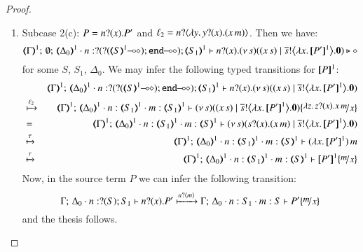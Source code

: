 \begin{proof}
\begin{enumerate}[1.]
	\item	Subcase 2(c): $P = n ? (x) . P'$ and $\ell_2 = n ? \langle \lambda y.\,y ? (x) . (x\, {m}) \rangle$.
		Then we have:
%
		\[
			\mapt{\Gamma}^{1};\, \emptyset;\, \mapt{\Delta_0}^{1} \cat 
			n: \btinp{\lhot{\btinp{\lhot{\tmap{S}{1}}}\tinact}} \tmap{S_1}{1}
			\proves
			\binp{n}{x} \newsp{s}{(\appl{x}{s})
			\Par 
			\bbout{\dual{s}}{\abs{x}{\pmap{P'}{1}}} \inact}
			\hastype \Proc
		\]
%
		for some $S$, $S_1$, $\Delta_0$.
		We may infer the following typed transitions for $[\!\![P]\!\!]^1$:
%
		\begin{eqnarray*}
			& & 
			\mapt{\Gamma}^{1};\, %
			\mapt{\Delta_0}^{1} \cat 
			n: \btinp{\lhot{\btinp{\lhot{\tmap{S}{1}}}\tinact}} \tmap{S_1}{1}
			\proves
			\binp{n}{x} \newsp{s}{(\appl{x}{s}) 
							\Par 
							\bbout{\dual{s}}{\abs{x}{\pmap{P'}{1}}} \inact} \\
			& \hby{\ell_2} & 
			\mapt{\Gamma}^{1};\, %
			\mapt{\Delta_0}^{1} \cat 
			n:\tmap{S_1}{1}
			\cat m:\tmap{S_1}{1}
			\proves
			\newsp{s}{(\appl{x}{s}) 
				\Par 
				\bbout{\dual{s}}{\abs{x}{\pmap{P'}{1}}} \inact} \subst{\abs{z}\binp{z}{x}\appl{x}{m}}{x} \\
			& = & 
			\mapt{\Gamma}^{1};\, %
			\mapt{\Delta_0}^{1} 
			\cat n:\tmap{S_1}{1}
			\cat m:\tmap{S}{1}
			\proves
			\newsp{s}{\binp{s}{x}(\appl{x}{m}) 
				\Par 
				\bbout{\dual{s}}{\abs{x}{\pmap{P'}{1}}} \inact}  \\
			& \hby{\tau} & 
			\mapt{\Gamma}^{1};\, %
			\mapt{\Delta_0}^{1} 
			\cat n:\tmap{S_1}{1}
			\cat m:\tmap{S}{1}
			\proves
			\appl{(\abs{x}{\pmap{P'}{1}})}{m}   \\
			& \hby{\tau} & 
			\mapt{\Gamma}^{1};\, %
			\mapt{\Delta_0}^{1} 
			\cat n:\tmap{S_1}{1}
			\cat m:\tmap{S}{1}
			\proves
			\pmap{P'}{1}\subst{m}{x}   
		\end{eqnarray*}
%
		Now, in the source term $P$ we can infer the following transition:
%
		\[
			\Gamma;\,  \Delta_0 \cat n:\btinp{S} S_1 \proves \binp{n}{x} P'
			\hby{\bactinp{n}{m}} 
			\Gamma;\,  \Delta_0 \cat n: S_1 \cat m: S \proves P'\subst{m}{x}
		\]
%
		and the thesis follows.

%
\end{enumerate}
\end{proof}


